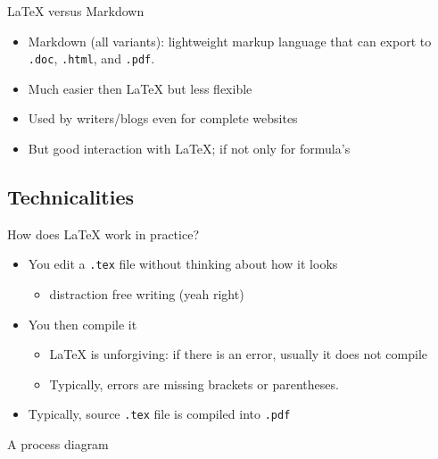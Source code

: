 \documentclass[ignorenonframetext]{beamer}
\begin{document}
{\begin{frame}{\LaTeX{} versus Markdown}
	\begin{itemize}
		\item Markdown (all variants): lightweight markup language that can export to \texttt{.doc}, \texttt{.html}, and \texttt{.pdf}.
		\newline
		\item Much easier then \LaTeX{} but less flexible
		\newline
		\item Used by writers/blogs even for complete websites
		\newline
		\item But good interaction with \LaTeX{}; if not only for formula's
	\end{itemize}
\end{frame}

\subsection{Technicalities}\label{technicalities}

\begin{frame}[fragile]{How does \LaTeX{} work in practice?}

\begin{itemize}
\item
  You edit a \texttt{.tex} file without thinking about how it looks

  \begin{itemize}
  \item
    distraction free writing (yeah right)
    \newline
  \end{itemize}
\item
  You then compile it

  \begin{itemize}
  \item
    \LaTeX{} is unforgiving: if there is an error, usually it does not
    compile
  \item
    Typically, errors are missing brackets or parentheses.\newline
  \end{itemize}
\item
  Typically, source \texttt{.tex} file is compiled into \texttt{.pdf}
\end{itemize}

\end{frame}

\begin{frame}{A process diagram}


\end{frame}}
\end{document}

